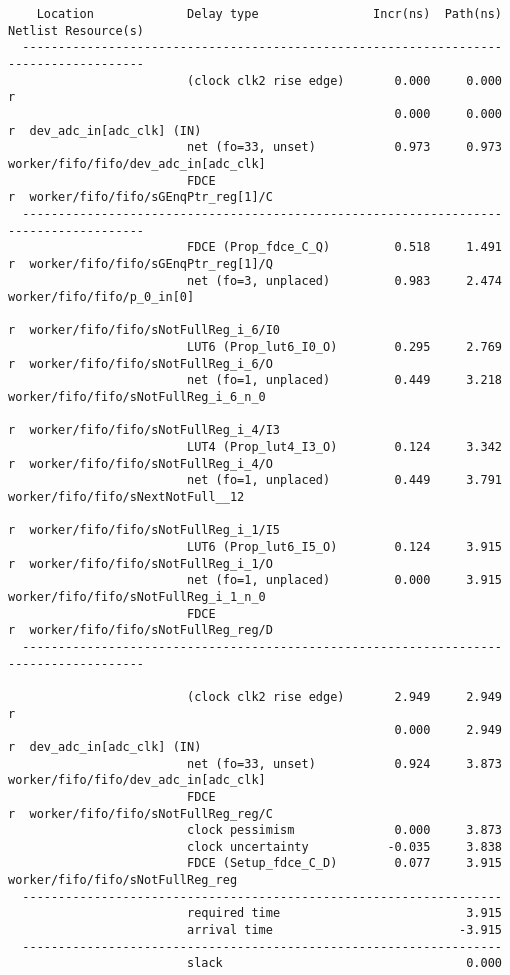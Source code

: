 \documentclass{article}
\begin{document}
\begin{lstlisting}
    Location             Delay type                Incr(ns)  Path(ns)    Netlist Resource(s)
  -------------------------------------------------------------------    -------------------
                         (clock clk2 rise edge)       0.000     0.000 r
                                                      0.000     0.000 r  dev_adc_in[adc_clk] (IN)
                         net (fo=33, unset)           0.973     0.973    worker/fifo/fifo/dev_adc_in[adc_clk]
                         FDCE                                         r  worker/fifo/fifo/sGEnqPtr_reg[1]/C
  -------------------------------------------------------------------    -------------------
                         FDCE (Prop_fdce_C_Q)         0.518     1.491 r  worker/fifo/fifo/sGEnqPtr_reg[1]/Q
                         net (fo=3, unplaced)         0.983     2.474    worker/fifo/fifo/p_0_in[0]
                                                                      r  worker/fifo/fifo/sNotFullReg_i_6/I0
                         LUT6 (Prop_lut6_I0_O)        0.295     2.769 r  worker/fifo/fifo/sNotFullReg_i_6/O
                         net (fo=1, unplaced)         0.449     3.218    worker/fifo/fifo/sNotFullReg_i_6_n_0
                                                                      r  worker/fifo/fifo/sNotFullReg_i_4/I3
                         LUT4 (Prop_lut4_I3_O)        0.124     3.342 r  worker/fifo/fifo/sNotFullReg_i_4/O
                         net (fo=1, unplaced)         0.449     3.791    worker/fifo/fifo/sNextNotFull__12
                                                                      r  worker/fifo/fifo/sNotFullReg_i_1/I5
                         LUT6 (Prop_lut6_I5_O)        0.124     3.915 r  worker/fifo/fifo/sNotFullReg_i_1/O
                         net (fo=1, unplaced)         0.000     3.915    worker/fifo/fifo/sNotFullReg_i_1_n_0
                         FDCE                                         r  worker/fifo/fifo/sNotFullReg_reg/D
  -------------------------------------------------------------------    -------------------

                         (clock clk2 rise edge)       2.949     2.949 r
                                                      0.000     2.949 r  dev_adc_in[adc_clk] (IN)
                         net (fo=33, unset)           0.924     3.873    worker/fifo/fifo/dev_adc_in[adc_clk]
                         FDCE                                         r  worker/fifo/fifo/sNotFullReg_reg/C
                         clock pessimism              0.000     3.873
                         clock uncertainty           -0.035     3.838
                         FDCE (Setup_fdce_C_D)        0.077     3.915    worker/fifo/fifo/sNotFullReg_reg
  -------------------------------------------------------------------
                         required time                          3.915
                         arrival time                          -3.915
  -------------------------------------------------------------------
                         slack                                  0.000





\end{lstlisting}

\fontsize{6}{12}\selectfont
\end{document}
